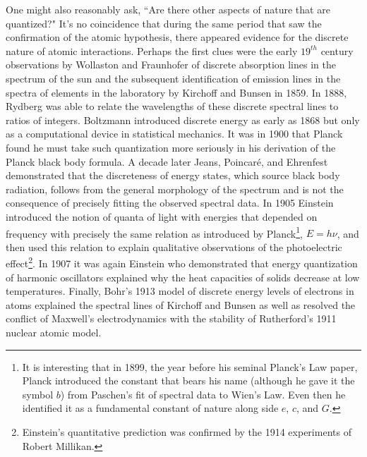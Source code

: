 \documentclass[12pt]{article}
\begin{document}
One might also reasonably ask, ``Are there other aspects of nature that are quantized?"  It's no coincidence that during the same period that saw the confirmation of the atomic hypothesis, there appeared evidence for the discrete nature of atomic interactions.  Perhaps the first clues were the early $19^{th}$ century observations by Wollaston and Fraunhofer of discrete absorption lines in the spectrum of the sun and the subsequent identification of emission lines in the spectra of elements in the laboratory by Kirchoff and Bunsen in 1859.   In 1888, Rydberg was able to relate the wavelengths of these discrete spectral lines to ratios of integers.  Boltzmann introduced discrete energy as early as 1868 but only as a computational device in statistical mechanics.  It was in 1900 that Planck found he must take such quantization more seriously in his derivation of the Planck black body formula\cite{Ba2009}.  A decade later Jeans, Poincar\'{e}, and Ehrenfest demonstrated that the discreteness of energy states, which source black body radiation, follows from the general morphology of the spectrum and is not the consequence of precisely fitting the observed spectral data\cite{No1993}.  In 1905 Einstein introduced the notion of quanta of light with energies that depended on frequency with precisely the same relation as introduced by Planck\footnote{It is interesting that in 1899, the year before his seminal Planck's Law paper, Planck introduced the constant that bears his name (although he gave it the symbol $b$) from Paschen's fit of spectral data to Wien's Law.  Even then he identified it as a fundamental constant of nature along side $e$, $c$, and $G$.\cite{Pl1899}}, $E=h\nu$, and then used this relation to explain qualitative observations of the photoelectric effect\footnote{Einstein's quantitative prediction was confirmed by the 1914 experiments of Robert Millikan.}.  In 1907 it was again Einstein who demonstrated that energy quantization of harmonic oscillators explained why the heat capacities of solids decrease at low temperatures.  Finally, Bohr's 1913 model of discrete energy levels of electrons in atoms explained the spectral lines of Kirchoff and Bunsen as well as resolved the conflict of Maxwell's electrodynamics with the stability of Rutherford's 1911 nuclear atomic model.
\end{document}
